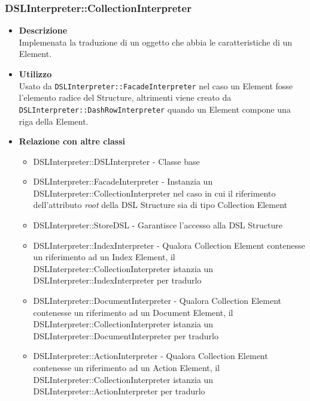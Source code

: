 \subsubsection{DSLInterpreter::CollectionInterpreter}
\begin{itemize}
\item \textbf{Descrizione} \hfill \\
Implemenata la traduzione di un oggetto che abbia le caratteristiche di un  Element.
\item \textbf{Utilizzo} \hfill \\
  Usato da \texttt{DSLInterpreter::FacadeInterpreter} \newline nel caso un  Element fosse l'elemento radice del  Structure, altrimenti viene creato da \texttt{DSLInterpreter::DashRowInterpreter} \newline quando un  Element compone una riga della  Element.
\item \textbf{Relazione con altre classi}
\begin{itemize}
\item DSLInterpreter::DSLInterpreter - Classe base
\item DSLInterpreter::FacadeInterpreter - Instanzia un DSLInterpreter::CollectionInterpreter nel caso in cui il riferimento dell'attributo \textit{root} della DSL Structure sia di tipo Collection Element 
\item DSLInterpreter::StoreDSL - Garantisce l'accesso alla DSL Structure
\item DSLInterpreter::IndexInterpreter - Qualora Collection Element contenesse un riferimento ad un Index Element, il DSLInterpreter::CollectionInterpreter istanzia un DSLInterpreter::IndexInterpreter per tradurlo
\item DSLInterpreter::DocumentInterpreter - Qualora Collection Element contenesse un riferimento ad un Document Element, il DSLInterpreter::CollectionInterpreter istanzia un DSLInterpreter::DocumentInterpreter per tradurlo
\item DSLInterpreter::ActionInterpreter - Qualora Collection Element contenesse un riferimento ad un Action Element, il DSLInterpreter::CollectionInterpreter istanzia un DSLInterpreter::ActionInterpreter per tradurlo
\end{itemize}
\end{itemize}

